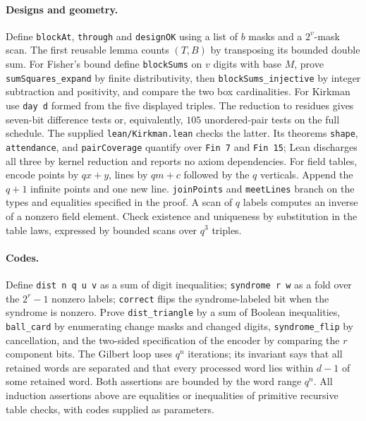 \paragraph{Designs and geometry.}
Define \texttt{blockAt}, \texttt{through} and \texttt{designOK} using
a list of \(b\) masks and a \(2^v\)-mask scan. The first reusable lemma
counts \((T,B)\) by transposing its bounded double sum. For Fisher's
bound define \texttt{blockSums} on \(v\) digits with base \(M\), prove
\texttt{sumSquares\_expand} by finite distributivity, then
\texttt{blockSums\_injective} by integer subtraction and positivity,
and compare the two box cardinalities. For Kirkman use \texttt{day d}
formed from the five displayed triples. The reduction to residues gives
seven-bit difference tests or, equivalently, \(105\) unordered-pair
tests on the full schedule. The supplied \texttt{lean/Kirkman.lean}
checks the latter. Its theorems \texttt{shape}, \texttt{attendance},
and \texttt{pairCoverage} quantify over \texttt{Fin 7} and \texttt{Fin 15};
Lean discharges all three by kernel reduction and reports no axiom dependencies. For field tables, encode points by \(qx+y\),
lines by \(qm+c\) followed by the \(q\) verticals. Append the \(q+1\)
infinite points and one new line. \texttt{joinPoints} and
\texttt{meetLines} branch on the types and equalities specified in the
proof. A scan of \(q\) labels computes an inverse of a nonzero field
element. Check existence and uniqueness by substitution in the table
laws, expressed by bounded scans over \(q^3\) triples.

\paragraph{Codes.}
Define \texttt{dist n q u v} as a sum of digit inequalities;
\texttt{syndrome r w} as a fold over the \(2^r-1\) nonzero labels;
\texttt{correct} flips the syndrome-labeled bit when the syndrome is
nonzero. Prove \texttt{dist\_triangle} by a sum of Boolean inequalities,
\texttt{ball\_card} by enumerating change masks and changed digits,
\texttt{syndrome\_flip} by cancellation, and the two-sided specification
of the encoder by comparing the \(r\) component bits. The Gilbert loop
uses \(q^n\) iterations; its invariant says that all retained words are
separated and that every processed word lies within \(d-1\) of some
retained word. Both assertions are bounded by the word range \(q^n\).
All induction assertions above are equalities or inequalities of
primitive recursive table checks, with codes supplied as parameters.

